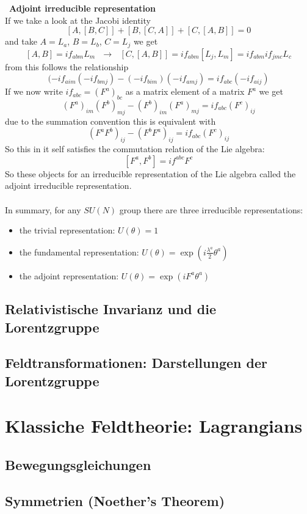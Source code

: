 \documentclass{include/thesisclass}
\newcommand{\df}{\rightarrow}
\newcommand{\sub}[1]{~\newline\newline\textbf{#1}\\}
\begin{document}
\sub{Adjoint irreducible representation}
If we take a look at the Jacobi identity
\[ [A,[B,C]] + [B,[C,A]] + [C,[A,B]] = 0\]
and take $A = L_a$, $B= L_b$, $C=L_j$ we get
\[ [A,B] = i f_{abm} L_m ~~~\df~~~ [C,[A,B]] = i f_{abm}[L_j,L_m] = if_{abm}if_{jmc} L_c\]
from this follows the relationship
\[ (-if_{aim}(-if_{bmj}) - (-if_{bim})(-if_{amj}) = if_{abc}(-if_{aij})\]
If we now write $if_{abc} = (F^a)_{bc}$ as a matrix element of a matrix $F^a$ we get
\[ (F^a)_{im} (F^b)_{mj} - (F^b)_{im}(F^a)_{mj} = i f_{abc} (F^c)_{ij}\]
due to the summation convention this is equivalent with
\[ (F^aF^b)_{ij} - (F^bF^a)_{ij} = if_{abc}(F^c)_{ij}\]
So this in it self satisfies the commutation relation of the Lie algebra:
\[ [F^a, F^b] = i f^{abc} F^c\]
So these objects for an irreducible representation of the Lie algebra called the adjoint irreducible representation.\\
\\
In summary, for any $SU(N)$ group there are three irreducible representations:
\begin{itemize}
\item the trivial representation: $U(\theta) = 1$
\item the fundamental representation: $U(\theta) = \exp\left( i \frac{\lambda^a}{2} \theta^a\right)$
\item the adjoint representation: $U(\theta) = \exp \left( i F^a \theta ^a\right)$
\end{itemize}


\section{Relativistische Invarianz und die Lorentzgruppe}
\section{Feldtransformationen: Darstellungen der Lorentzgruppe}

\chapter{Klassiche Feldtheorie: Lagrangians}
\section{Bewegungsgleichungen}
\section{Symmetrien (Noether's Theorem)}
\end{document}

